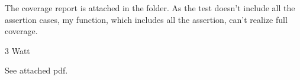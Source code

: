 \documentclass[11pt]{article}
\begin{document}
    The coverage report is attached in the folder. As the test doesn't
include all the assertion cases, my function, which includes all the
assertion, can't realize full coverage.

    3 Watt

    See attached pdf.


    
    
    
    
\end{document}
